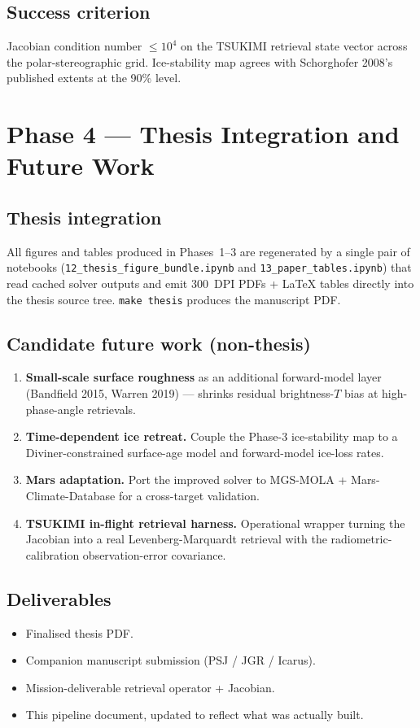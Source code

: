 \documentclass[11pt,a4paper]{book}
\begin{document}
\section{Success criterion}
Jacobian condition number $\le 10^{4}$ on the TSUKIMI retrieval state
vector across the polar-stereographic grid. Ice-stability map agrees
with Schorghofer 2008's published extents at the 90\% level.

\chapter{Phase 4 --- Thesis Integration and Future Work}
\section{Thesis integration}
All figures and tables produced in Phases~1--3 are regenerated by a
single pair of notebooks (\texttt{12\_thesis\_figure\_bundle.ipynb}
and \texttt{13\_paper\_tables.ipynb}) that read cached solver outputs
and emit 300~DPI PDFs + LaTeX tables directly into the thesis source
tree. \texttt{make thesis} produces the manuscript PDF.

\section{Candidate future work (non-thesis)}
\begin{enumerate}
\item \textbf{Small-scale surface roughness} as an additional forward-model layer (Bandfield 2015, Warren 2019) --- shrinks residual brightness-$T$ bias at high-phase-angle retrievals.
\item \textbf{Time-dependent ice retreat.} Couple the Phase-3 ice-stability map to a Diviner-constrained surface-age model and forward-model ice-loss rates.
\item \textbf{Mars adaptation.} Port the improved solver to MGS-MOLA + Mars-Climate-Database for a cross-target validation.
\item \textbf{TSUKIMI in-flight retrieval harness.} Operational wrapper turning the Jacobian into a real Levenberg-Marquardt retrieval with the radiometric-calibration observation-error covariance.
\end{enumerate}

\section{Deliverables}
\begin{itemize}
\item Finalised thesis PDF.
\item Companion manuscript submission (PSJ / JGR / Icarus).
\item Mission-deliverable retrieval operator + Jacobian.
\item This pipeline document, updated to reflect what was actually built.
\end{itemize}
\end{document}
